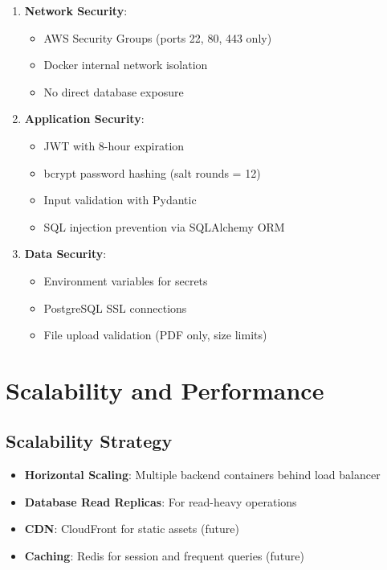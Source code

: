 \documentclass[12pt,a4paper]{report}
\begin{document}
\begin{enumerate}
    \item \textbf{Network Security}:
    \begin{itemize}
        \item AWS Security Groups (ports 22, 80, 443 only)
        \item Docker internal network isolation
        \item No direct database exposure
    \end{itemize}
    
    \item \textbf{Application Security}:
    \begin{itemize}
        \item JWT with 8-hour expiration
        \item bcrypt password hashing (salt rounds = 12)
        \item Input validation with Pydantic
        \item SQL injection prevention via SQLAlchemy ORM
    \end{itemize}
    
    \item \textbf{Data Security}:
    \begin{itemize}
        \item Environment variables for secrets
        \item PostgreSQL SSL connections
        \item File upload validation (PDF only, size limits)
    \end{itemize}
\end{enumerate}

\chapter{Scalability and Performance}

\section{Scalability Strategy}

\begin{itemize}
    \item \textbf{Horizontal Scaling}: Multiple backend containers behind load balancer
    \item \textbf{Database Read Replicas}: For read-heavy operations
    \item \textbf{CDN}: CloudFront for static assets (future)
    \item \textbf{Caching}: Redis for session and frequent queries (future)
\end{itemize}
\end{document}
